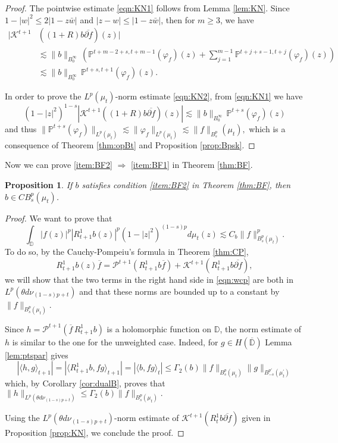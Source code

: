 \documentclass[12pt,twoside,leqno,final]{amsart}
\theoremstyle{plain}
\newtheorem{prop}[thm]{Proposition}
\begin{document}
\begin{proof}
The pointwise estimate \eqref{eqn:KN1} follows from Lemma \ref{lem:KN}. Since $1-|w|^2\le 2|1-z\bar w|$ and $|z-w|\le |1-z\bar w|$,
then for $m\ge 3$, we have
\begin{align*}
|{{\mathcal K}}^{t+1}&((1+R)b\overline {{\partial} f})(z)| \\
&\lesssim \|b\|_{B^\infty_0}\,\left({\mathbb{P}}^{t+m-2+s,t+m-1}\left( \varphi_f \right)(z) 
+\sum_{j=1}^{m-1} {\mathbb{P}}^{t+j+s-1,t+j}\left( \varphi_f \right)(z) \right)\\
&\lesssim \|b\|_{B^\infty_0}\,{\mathbb{P}}^{t+s,t+1}\left( \varphi_f \right)(z) .
\end{align*}

In order to prove the $L^p(\mu_t)$-norm estimate \eqref{eqn:KN2}, from \eqref{eqn:KN1} we have 
$$
(1-|z|^2)^{1-s}|{{\mathcal K}}^{t+1}((1+R)b\overline {{\partial} f})(z)|\lesssim  \|b\|_{B^\infty_0}\,{\mathbb{P}}^{t+s}\left( \varphi_f \right)(z) 
$$
and thus
$
\|{\mathbb{P}}^{t+s}(\varphi_f)\|_{L^p(\mu_t)}\lesssim \|\varphi_f\|_{L^p(\mu_t)}
\lesssim \|f\|_{B^p_s}(\mu_t),
$
which is a consequence of Theorem \ref{thm:opBt} and Proposition \ref{prop:Bpsk}.
\end{proof}

Now we can prove  \eqref{item:BF2} $\Longrightarrow$ \eqref{item:BF1} in Theorem \ref{thm:BF}.

\begin{prop}
If $b$ satisfies condition \eqref{item:BF2} in Theorem \ref{thm:BF}, then $b\in CB^p_{s}(\mu_t)$.
\end{prop}

\begin{proof}
We want to prove that 
$$
\int_{{\mathbb D}} |f(z)|^p|R^1_{t+1} b(z)|^p (1-|z|^2)^{(1-s)p}d\mu_t(z)\lesssim C_b\|f\|_{B^p_s(\mu_t)}^p.
$$
To do so, by  the Cauchy-Pompeiu's formula in Theorem \ref{thm:CP}, 
\begin{equation}\label{eqn:wcp}
R^1_{t+1}b(z)\overline {f}={{\mathcal P}}^{t+1}(R^1_{t+1} b\overline {f})+{{\mathcal K}}^{t+1}(R^1_{t+1} b\overline {{\partial} f}),
\end{equation}
we will show that the two terms in the right hand side in  \eqref{eqn:wcp} are both in
 $L^p(\theta d\nu_{(1-s)p+t})$ and that these norms are bounded up to a constant by 
  $\|f\|_{B^p_s(\mu_t)}$.

Since $h={{\mathcal P}}^{t+1}(\overline{f}\,R^1_{t+1} b)$ is a holomorphic function on ${{\mathbb D}}$, the norm estimate of $h$ is similar to the one for the unweighted case. Indeed, for $g\in H(\overline{{\mathbb D}})$ 
Lemma  \ref{lem:ptspar} gives
$$
|\langle h, g\rangle_{t+1}|=|\langle R^1_{t+1}b, fg\rangle_{t+1}|
=|\langle b, fg\rangle_{t}|\le \Gamma_2(b)\|f\|_{B^p_s(\mu_t)}\|g\|_{B^{p'}_{-s}(\mu^\prime_t)}
$$
which, by  Corollary \ref{cor:dualB}, proves that 
$
\|h\|_{L^p(\theta d\nu_{(1-s)p+t})}\le \Gamma_2(b)\|f\|_{B^p_s(\mu_t)}.
$  
 

Using the $L^p(\theta d\nu_{(1-s)p+t})$-norm estimate of  ${{\mathcal K}}^{t+1}(R^1_tb\overline{{\partial} f})$ given in Proposition \ref{prop:KN}, we conclude the proof.
\end{proof}
\end{document}
